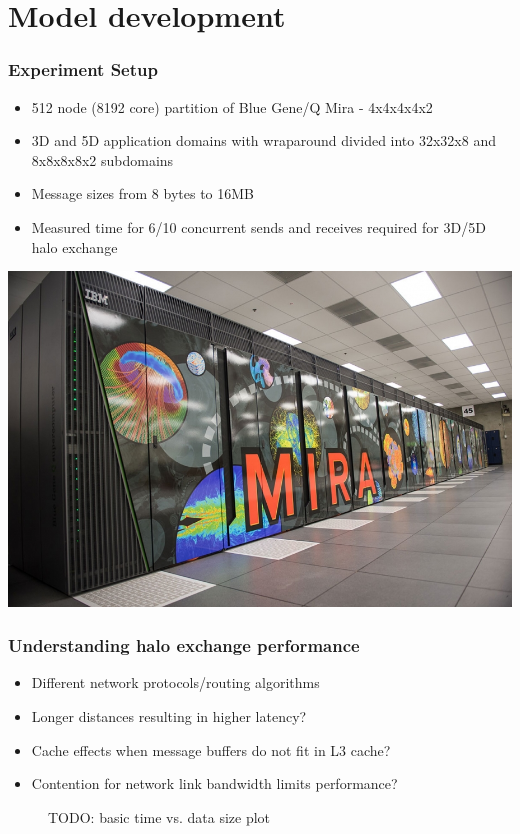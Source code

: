 \documentclass{beamer}
\begin{document}
\section{Model development}
\begin{frame}
\frametitle{Experiment Setup}
\begin{itemize}
  \item 512 node (8192 core) partition of Blue Gene/Q Mira - 4x4x4x4x2
  \item 3D and 5D application domains with wraparound
        divided into 32x32x8 and 8x8x8x8x2 subdomains
  \item Message sizes from 8 bytes to 16MB
  \item Measured time for 6/10 concurrent sends and receives required 
        for 3D/5D halo exchange
\end{itemize}

\centering
\includegraphics[width=0.45\linewidth]{mira}

\end{frame}

\begin{frame}
\frametitle{Understanding halo exchange performance}
\begin{itemize}
  \item Different network protocols/routing algorithms
  \item Longer distances resulting in higher latency?
  \item Cache effects when message buffers do not fit in L3 cache?
  \item Contention for network link bandwidth limits performance?
\end{itemize}

\begin{figure}
TODO: basic time vs. data size plot
\end{figure}
\end{frame}

\end{document}

